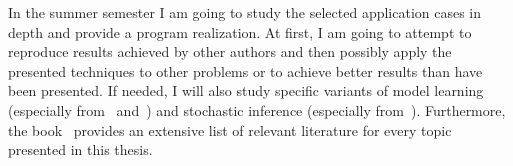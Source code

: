 \documentclass[english,cover]{fitthesis} %
\begin{document}
\medskip

In the summer semester I am going to study the selected application cases in depth and provide a program realization. At first, I am going to attempt to reproduce results achieved by other authors and then possibly apply the presented techniques to other problems or to achieve better results than have been presented. If needed, I will also study specific variants of model learning (especially from~\cite{heckerman96} and~\cite{buntine94}) and stochastic inference (especially from~\cite{neal93}). Furthermore, the book~\cite{pgm} provides an extensive list of relevant literature for every topic presented in this thesis. %











\ifczech
  
\else 
  
%  
\fi
  \begin{flushleft}
  \end{flushleft}
  \appendix
  
\end{document}
